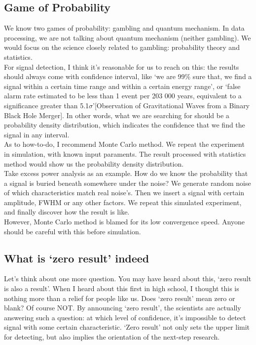 \documentclass[
12pt, %
a4paper %
]{extreport}
\theoremstyle{plain}
\begin{document}
\subsection{Game of Probability}
We know two games of probability: gambling and quantum mechanism. In data processing, we are not talking about quantum mechanism (neither gambling). We would focus on the science closely related to gambling: probability theory and statistics.\\
For signal detection, I think it’s reasonable for us to reach on this: the results should always come with confidence interval, like `we are 99\% sure that, we find a signal within a certain time range and within a certain energy range’, or `false alarm rate estimated to be less than 1 event per 203 000 years, equivalent to a significance greater than 5.1$\sigma$’[Observation of Gravitational Waves from a Binary Black Hole Merger]. In other words, what we are searching for should be a probability density distribution, which indicates the confidence that we find the signal in any interval.\\
As to how-to-do, I recommend Monte Carlo method. We repeat the experiment in simulation, with known input paraments. The result processed with statistics method would show us the probability density distribution.\\
Take excess power analysis as an example. How do we know the probability that a signal is buried beneath somewhere under the noise? We generate random noise of which characteristics match real noise’s. Then we insert a signal with certain amplitude, FWHM or any other factors. We repeat this simulated experiment, and finally discover how the result is like.\\
However, Monte Carlo method is blamed for its low convergence speed. Anyone should be careful with this before simulation.
\subsection{What is `zero result' indeed}
Let’s think about one more question. You may have heard about this, ‘zero result is also a result’. When I heard about this first in high school, I thought this is nothing more than a relief for people like us. Does ‘zero result’ mean zero or blank? Of course NOT. By announcing ‘zero result’, the scientists are actually answering such a question: at which level of confidence, it’s impossible to detect signal with some certain characteristic. ‘Zero result’ not only sets the upper limit for detecting, but also implies the orientation of the next-step research.\
\end{document}
